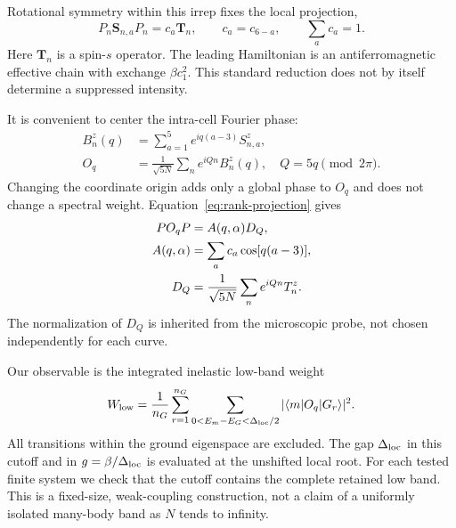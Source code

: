 Rotational symmetry within this irrep fixes the local projection,
\begin{equation}
 P_n\bm S_{n,a}P_n=c_a\bm T_n,\qquad
 c_a=c_{6-a},\qquad \sum_a c_a=1.
 \label{eq:rank-projection}
\end{equation}
Here $\bm T_n$ is a spin-$s$ operator. The leading Hamiltonian is an
antiferromagnetic effective chain with exchange $\beta c_1^2$.
This standard reduction does not by itself determine a suppressed intensity.

It is convenient to center the intra-cell Fourier phase:
\begin{align}
 B_n^z(q)&=\sum_{a=1}^5 e^{iq(a-3)}S_{n,a}^z,\\
 O_q&=\frac{1}{\sqrt{5N}}\sum_n e^{iQn}B_n^z(q),
 \quad Q=5q\pmod{2\pi}.
\end{align}
Changing the coordinate origin adds only a global phase to $O_q$ and does not
change a spectral weight. Equation~\eqref{eq:rank-projection} gives
\begin{align}
 P O_qP&=A(q,\alpha)D_Q,\notag\\
 A(q,\alpha)&=\sum_a c_a\cos[q(a-3)],\\
 D_Q&=\frac{1}{\sqrt{5N}}\sum_n e^{iQn}T_n^z.
 \label{eq:rank-amplitude}
\end{align}
The normalization of $D_Q$ is inherited from the microscopic probe, not
chosen independently for each curve.

Our observable is the integrated inelastic low-band weight
\begin{equation}
 W_{\mathrm{low}}=\frac{1}{n_G}\sum_{r=1}^{n_G}
 \sum_{0<E_m-E_G<\Delta_{\mathrm{loc}}/2}|\langle m|O_q|G_r\rangle|^2.
 \label{eq:rank-weight}
\end{equation}
All transitions within the ground eigenspace are excluded.
The gap $\Delta_{\mathrm{loc}}$ in this cutoff and in $g=\beta/\Delta_{\mathrm{loc}}$ is evaluated at the
unshifted local root. For each tested finite system we check that the cutoff
contains the complete retained low band. This is a fixed-size,
weak-coupling construction, not a claim of a uniformly isolated many-body
band as $N$ tends to infinity.
